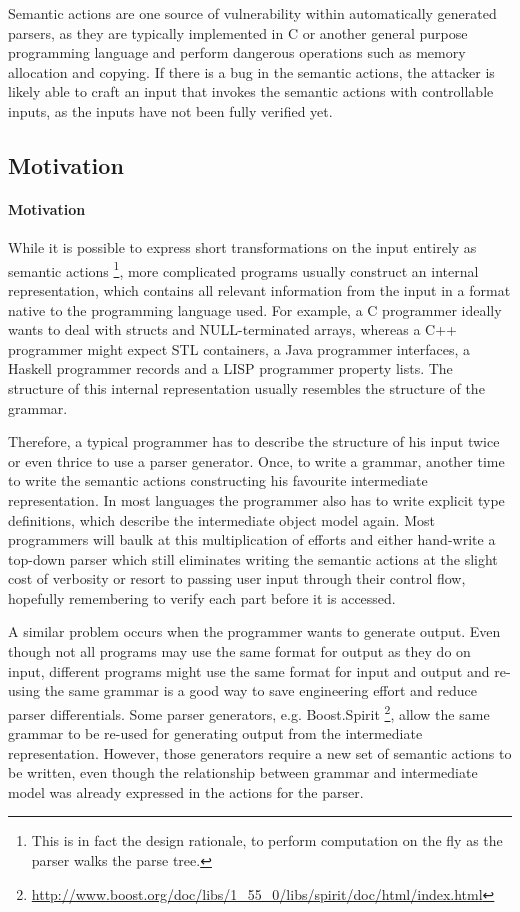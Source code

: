 \documentclass{article}
\begin{document}
Semantic actions are one source of vulnerability within automatically generated parsers, as they are
typically implemented in C or another general purpose programming language and perform dangerous
operations such as memory allocation and copying. If there is a bug in the semantic actions, the
attacker is likely able to craft an input that invokes the semantic actions with controllable
inputs, as the inputs have not been fully verified yet.

\subsection{Motivation}
\paragraph{Motivation}
While it is possible to express short transformations on the input entirely as semantic actions
\footnote{This is in fact the design rationale, to perform computation on the fly as the parser
  walks the parse tree.}, more complicated programs usually construct an internal representation,
which contains all relevant information from the input in a format native to the programming
language used. For example, a C programmer ideally wants to deal with structs and NULL-terminated
arrays, whereas a C++ programmer might expect STL containers, a Java programmer interfaces, a
Haskell programmer records and a LISP programmer property lists. 
 The structure of this internal representation usually resembles the structure of the grammar. 

Therefore, a typical programmer has to describe the structure of his input twice or even thrice to
use a parser generator. Once, to write a grammar, another time to write the semantic actions
constructing his favourite intermediate representation. In most languages the programmer also has to
write explicit type definitions, which describe the intermediate object model again. Most
programmers will baulk at this multiplication of efforts and either hand-write a top-down parser
which still eliminates writing the semantic actions at the slight cost of verbosity or resort to
passing user input through their control flow, hopefully remembering to verify each part before
it is accessed. 

A similar problem occurs when the programmer wants to generate output. 
Even though not all programs may use the same format for output as they do on input, different
programs might use the same format for input and output and re-using the same grammar is a good way
to save engineering effort and reduce parser differentials.
Some parser generators, e.g.
Boost.Spirit \footnote{\url{http://www.boost.org/doc/libs/1_55_0/libs/spirit/doc/html/index.html}},
allow the same grammar to be re-used for generating output from the intermediate representation.
However, those generators require a new set of semantic actions to be written, even though the
relationship between grammar and intermediate model was already expressed in the actions for the
parser.
\end{document}
